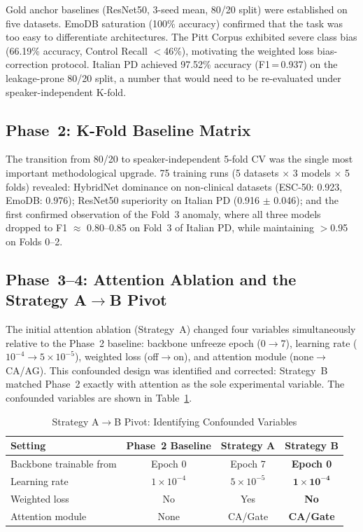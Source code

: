 \documentclass[oneside,openany]{final_report}
\begin{document}
Gold anchor baselines (ResNet50, 3-seed mean, 80/20 split) were established on five datasets. EmoDB saturation (100\% accuracy) confirmed that the task was too easy to differentiate architectures. The Pitt Corpus exhibited severe class bias (66.19\% accuracy, Control Recall $<$46\%), motivating the weighted loss bias-correction protocol. Italian PD achieved 97.52\% accuracy (F1\,=\,0.937) on the leakage-prone 80/20 split, a number that would need to be re-evaluated under speaker-independent K-fold.

\subsection{Phase~2: K-Fold Baseline Matrix}

The transition from 80/20 to speaker-independent 5-fold CV was the single most important methodological upgrade. 75 training runs (5 datasets $\times$ 3 models $\times$ 5 folds) revealed: HybridNet dominance on non-clinical datasets (ESC-50: 0.923, EmoDB: 0.976); ResNet50 superiority on Italian PD (0.916 $\pm$ 0.046); and the first confirmed observation of the Fold~3 anomaly, where all three models dropped to F1 $\approx$ 0.80--0.85 on Fold~3 of Italian PD, while maintaining $>$0.95 on Folds 0--2.

\subsection{Phase~3--4: Attention Ablation and the Strategy A$\to$B Pivot}

The initial attention ablation (Strategy~A) changed four variables simultaneously relative to the Phase~2 baseline: backbone unfreeze epoch (0$\to$7), learning rate ($10^{-4}\to 5\times 10^{-5}$), weighted loss (off$\to$on), and attention module (none$\to$CA/AG). This confounded design was identified and corrected: Strategy~B matched Phase~2 exactly with attention as the sole experimental variable. The confounded variables are shown in Table~\ref{tab:strategy_pivot}.

\begin{table}[H]
\centering
\caption{Strategy A$\to$B Pivot: Identifying Confounded Variables}
\label{tab:strategy_pivot}
\small
\begin{tabular}{l c c c}
\toprule
\textbf{Setting} & \textbf{Phase~2 Baseline} & \textbf{Strategy A} & \textbf{Strategy B} \\
\midrule
Backbone trainable from & Epoch 0 & Epoch 7 & \textbf{Epoch 0} \\
Learning rate & $1 \times 10^{-4}$ & $5 \times 10^{-5}$ & $\mathbf{1 \times 10^{-4}}$ \\
Weighted loss & No & Yes & \textbf{No} \\
Attention module & None & CA/Gate & \textbf{CA/Gate} \\
\bottomrule
\end{tabular}
\end{table}
\end{document}
